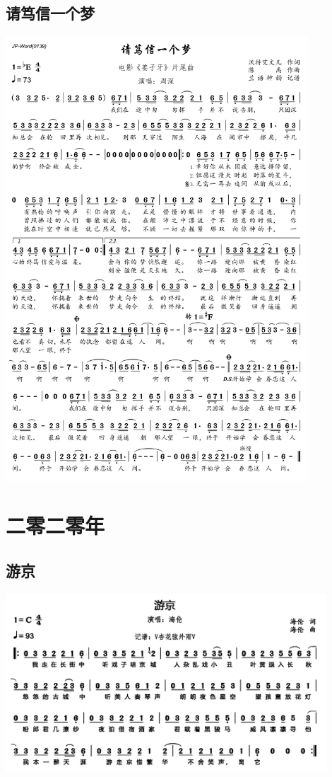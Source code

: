 \documentclass[cn,pad,twocol]{elegantbook}
\begin{document}
\section{请笃信一个梦} \includegraphics[width=0.85\textwidth]{rpi400/20210206请笃信一个梦.png}

\chapter{二零二零年}
\section{游京} \includegraphics[width=0.9\textwidth]{macos/2020游京.png}
\end{document}
